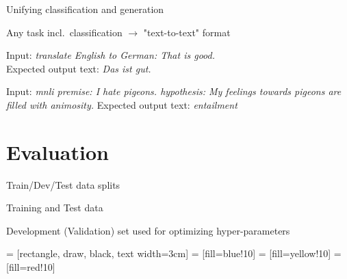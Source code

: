\documentclass[12pt,aspectratio=169,handout]{beamer}
\begin{document}
\begin{frame}{Unifying classification and generation}

Any task incl.\ classification $\to$ "text-to-text" format

\begin{example}[Translation En-De]
Input: \emph{translate English to German: That is good.} \\
Expected output text: \emph{Das ist gut.}
\end{example}

\begin{example}[MNLI]
Input: \emph{mnli premise: I hate pigeons. hypothesis: My feelings towards pigeons are filled with animosity.}
Expected output text: \emph{entailment}
\end{example}


\end{frame}



\section{Evaluation}


\begin{frame}{ Train/Dev/Test data splits}

Training and Test data

Development (Validation) set used for optimizing hyper-parameters

 = [rectangle, draw, black, text width=3cm]
 = [fill=blue!10]
 = [fill=yellow!10]
 = [fill=red!10]

\begin{figure}


\end{figure}

\end{frame}
\end{document}
